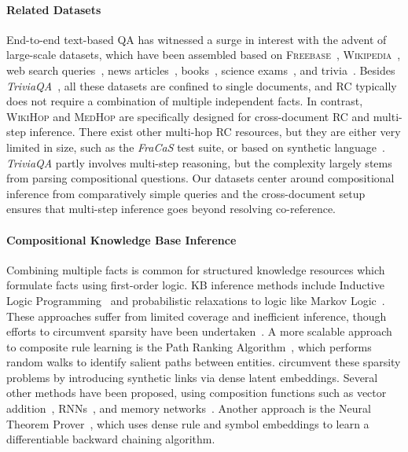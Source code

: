 \documentclass[11pt,letterpaper]{article}
\newcommand{\MedHop}{\textsc{MedHop}\xspace}
\newcommand{\TriviaQA}{\emph{TriviaQA}\xspace}
\newcommand{\WikiHop}{\textsc{WikiHop}\xspace}
\newcommand{\Wikipedia}{\textsc{Wikipedia}\xspace}
\begin{document}
\paragraph{Related Datasets}
End-to-end text-based QA has witnessed a surge in interest with the advent of large-scale datasets, which have been assembled based on \textsc{Freebase}~\cite{Berant13WebQuestions,Bordes2015SimpleQuestions}, \Wikipedia~\cite{Yang2015_WikiQA,Rajpurkar2016_SQUAD,hewlett2016_wikireading}, 
web search queries~\cite{Nguyen2016MSMARCO}, news articles~\cite{hermann2015teaching,Onishi2016Who}, books~\cite{Hill2015CBT,paperno2016lambada}, science exams~\cite{welbl2017crowdsourcing}, and trivia~\cite{BoydGraber_2012_Besting,dunn2017searchqa}.
Besides \emph{TriviaQA}~\cite{Joshi_2017_TriviaQA}, all these datasets are confined to single documents, and RC typically does not require a combination of multiple independent facts.
In contrast, \WikiHop and \MedHop are specifically designed for cross-document RC and multi-step inference.
There exist other multi-hop RC resources, but they are either very limited in size, such as the \emph{FraCaS} test suite, or based on synthetic language~\cite{Weston2015_bAbI}.
\TriviaQA partly involves multi-step reasoning, but the complexity largely stems from parsing compositional questions.
Our datasets center around compositional inference from comparatively simple queries and the cross-document setup ensures that multi-step inference goes beyond resolving co-reference.


\paragraph{Compositional Knowledge Base Inference}
Combining multiple facts is common for structured knowledge resources which formulate facts using first-order logic.
KB inference methods include Inductive Logic Programming~\cite{Quinlan1990_FOIL,Pazzani1991_FOCL,Richards1991_FORTE} and probabilistic relaxations to logic like Markov Logic~\cite{RichardsonDomingos2006_MLN,schoenmackers2008_scaling}.
These approaches suffer from limited coverage and inefficient inference, though efforts to circumvent sparsity have been undertaken~\cite{schoenmackers2008_scaling,Schoenmackers2010_WebHorn}.
A more scalable approach to composite rule learning is the Path Ranking Algorithm~\cite{lao2010PRA,lao2011random}, which performs random walks to identify salient paths between entities.
 circumvent these sparsity problems by introducing synthetic links via dense latent embeddings.
Several other methods have been proposed, using composition functions such as vector addition~\cite{Bordes2014_Subgraph}, RNNs~\cite{neelakantan2015compositional,das2016chains}, 
and memory networks~\cite{jain_2016_question}.
Another approach is the Neural Theorem Prover~\cite{rocktaschel2017NTP}, which uses dense rule and symbol embeddings to learn a differentiable  backward chaining algorithm.
\end{document}
